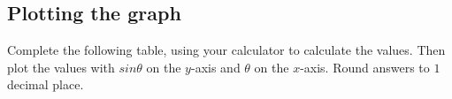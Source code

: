 \subsection*{Plotting the graph}
\nopagebreak
Complete the following table, using your calculator to calculate the values. Then plot the values with $sin\theta $ on the $y$-axis and $\theta $ on the $x$-axis. Round answers to $1$ decimal place.\par 
\setlength\mytablespace{16\tabcolsep}
\addtolength\mytablespace{9\arrayrulewidth}
\setlength\mytablewidth{\linewidth}
\setlength\mytableroom{\mytablewidth}
\addtolength\mytableroom{-\mytablespace}
\setlength\myfixedwidth{0pt}
\setlength\mystarwidth{\mytableroom}
\addtolength\mystarwidth{-\myfixedwidth}
\divide{}
